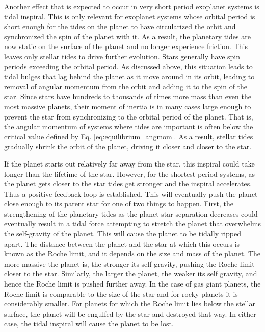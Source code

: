 Another effect that is expected to occur in very short period exoplanet systems
is tidal inspiral. This is only relevant for exoplanet systems whose orbital
period is short enough for the tides on the planet to have circularized the
orbit and synchronized the spin of the planet with it. As a result, the
planetary tides are now static on the surface of the planet and no longer
experience friction. This leaves only stellar tides to drive further evolution.
Stars generally have spin periods exceeding the orbital period. As discussed
above, this situation leads to tidal bulges that lag behind the planet as it
move around in its orbit, leading to removal of angular momentum from the orbit
and adding it to the spin of the star. Since stars have hundreds to thousands of
times more mass than even the most massive planets, their moment of inertia is
in many cases large enough to prevent the star from synchronizing to the orbital
period of the planet. That is, the angular momentum of systems where tides are
important is often below the critical value defined by Eq.
\ref{eq:equilibrium_angmom}. As a result, stellar tides gradually shrink the
orbit of the planet, driving it closer and closer to the star.

If the planet starts out relatively far away from the star, this inspiral could
take longer than the lifetime of the star. However, for the shortest period
systems, as the planet gets closer to the star tides get stronger and the
inspiral accelerates. Thus a positive feedback loop is established. This will
eventually push the planet close enough to its parent star for one of two things
to happen. First, the strengthening of the planetary tides as the planet-star
separation decreases could eventually result in a tidal force attempting to
stretch the planet that overwhelms the self-gravity of the planet. This will
cause the planet to be tidally ripped apart. The distance between the planet and
the star at which this occurs is known as the Roche limit, and it depends on the
size and mass of the planet. The more massive the planet is, the stronger its
self gravity, pushing the Roche limit closer to the star.  Similarly, the larger
the planet, the weaker its self gravity, and hence the Roche limit is pushed
further away. In the case of gas giant planets, the Roche limit is comparable to
the size of the star and for rocky planets it is considerably smaller. For
planets for which the Roche limit lies below the stellar surface, the planet
will be engulfed by the star and destroyed that way. In either case, the tidal
inspiral will cause the planet to be lost.

